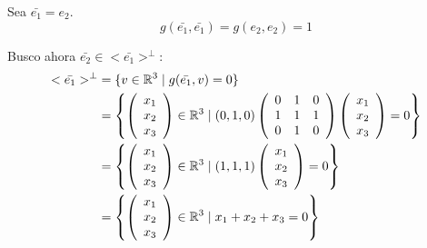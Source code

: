 \documentclass[12pt]{article}
\begin{document}
\begin{ejercicio}
\begin{enumerate}
        Sea $\bar{e_1}=e_2$.
        \begin{equation*}
            g(\bar{e_1}, \bar{e_1}) = g(e_2, e_2) = 1
        \end{equation*}

        Busco ahora $\bar{e_2}\in <\bar{e_1}>^\perp$:
        \begin{equation*}\begin{split}
                <\bar{e_1}>^\perp &= \{v \in \mathbb{R}^3 \mid g(\bar{e_1},v) = 0\} \\
                &= \left\{ \left(\begin{array}{c}
                     x_1 \\ x_2 \\ x_3
                \end{array} \right) \in \mathbb{R}^3 \mid (0, 1, 0) \left(\begin{array}{ccc}
                    0 & 1 & 0 \\
                    1 & 1 & 1 \\
                    0 & 1 & 0 \\
                \end{array} \right) 
                \left(\begin{array}{c}
                     x_1 \\ x_2 \\ x_3
                \end{array} \right) = 0\right\} \\
                &= \left\{ \left(\begin{array}{c}
                     x_1 \\ x_2 \\ x_3 
                \end{array} \right) \in \mathbb{R}^3 \mid (1,1,1)
                \left(\begin{array}{c}
                     x_1 \\ x_2 \\ x_3
                \end{array} \right) = 0\right\} \\
                &= \left\{ \left(\begin{array}{c}
                     x_1 \\ x_2 \\ x_3
                \end{array} \right) \in \mathbb{R}^3 \mid x_1+x_2+x_3=0\right\}
            \end{split}\end{equation*}


\end{enumerate}
\end{ejercicio}
\end{document}

